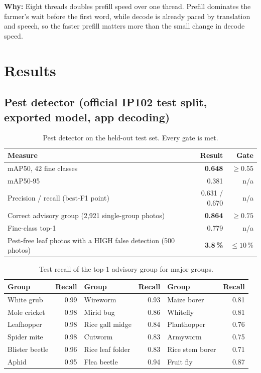 \documentclass[11pt,a4paper]{article}
\newcommand{\why}[1]{\par\smallskip\noindent\colorbox{leaflight}{\parbox{\dimexpr\linewidth-2\fboxsep}{\small\textbf{\color{leaf}Why:} #1}}\par\smallskip}
\begin{document}
\why{Eight threads doubles prefill speed over one thread. Prefill dominates the farmer's wait before the first word,
while decode is already paced by translation and speech, so the faster prefill matters more than the small change in
decode speed.}

\section{Results}

\subsection{Pest detector (official IP102 test split, exported model, app decoding)}
\begin{table}[h]
\centering\small
\begin{tabular}{@{}lrr@{}}
\toprule
\textbf{Measure} & \textbf{Result} & \textbf{Gate} \\
\midrule
mAP50, 42 fine classes & \textbf{0.648} & $\geq 0.55$ \\
mAP50-95 & 0.381 & n/a \\
Precision / recall (best-F1 point) & 0.631 / 0.670 & n/a \\
Correct advisory group (2,921 single-group photos) & \textbf{0.864} & $\geq 0.75$ \\
Fine-class top-1 & 0.779 & n/a \\
Pest-free leaf photos with a HIGH false detection (500 photos) & \textbf{3.8\,\%} & $\leq 10\,\%$ \\
\bottomrule
\end{tabular}
\caption{Pest detector on the held-out test set. Every gate is met.}
\end{table}

\begin{table}[h]
\centering\small
\begin{tabular}{@{}lr@{\hspace{2.2em}}lr@{\hspace{2.2em}}lr@{}}
\toprule
\textbf{Group} & \textbf{Recall} & \textbf{Group} & \textbf{Recall} & \textbf{Group} & \textbf{Recall} \\
\midrule
White grub & 0.99 & Wireworm & 0.93 & Maize borer & 0.81 \\
Mole cricket & 0.98 & Mirid bug & 0.86 & Whitefly & 0.81 \\
Leafhopper & 0.98 & Rice gall midge & 0.84 & Planthopper & 0.76 \\
Spider mite & 0.98 & Cutworm & 0.83 & Armyworm & 0.75 \\
Blister beetle & 0.96 & Rice leaf folder & 0.83 & Rice stem borer & 0.71 \\
Aphid & 0.95 & Flea beetle & 0.94 & Fruit fly & 0.87 \\
\bottomrule
\end{tabular}
\caption{Test recall of the top-1 advisory group for major groups.}
\end{table}
\end{document}
